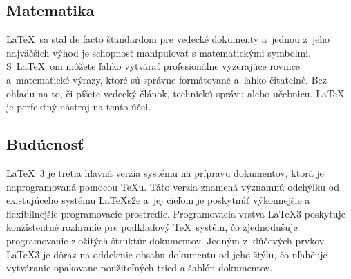 \documentclass[a4paper, 11pt]{article}
\begin{document}
\subsection{Matematika}
\LaTeX \ sa stal de facto štandardom pre vedecké dokumenty a~jednou z~jeho najväčších výhod je schopnosť manipulovať s matematickými symbolmi. S~\LaTeX \ om môžete ľahko vytvárať profesionálne vyzerajúce rovnice a~matematické výrazy, ktoré sú správne formátované a~ľahko čitateľné. Bez ohľadu na to, či píšete vedecký článok, technickú správu alebo učebnicu, LaTeX je perfektný nástroj na tento účel\cite{WeiserTexMatematics}.

\subsection{Budúcnosť}
\LaTeX \ 3 je tretia hlavná verzia systému na prípravu dokumentov, ktorá je naprogramovaná pomocou TeXu. Táto verzia znamená významnú odchýlku od existujúceho systému \LaTeX s2e a~jej cieľom je poskytnúť výkonnejšie a flexibilnejšie programovacie prostredie. Programovacia vrstva \LaTeX 3 poskytuje konzistentné rozhranie pre podkladový \TeX \ systém, čo zjednodušuje programovanie zložitých štruktúr dokumentov. Jedným z kľúčových prvkov \LaTeX 3 je dôraz na oddelenie obsahu dokumentu od jeho štýlu, čo uľahčuje vytváranie opakovane použiteľných tried a šablón dokumentov\cite{LATEX3}. 

\newpage

\renewcommand{\refname}{Literatúra}

\end{document}
